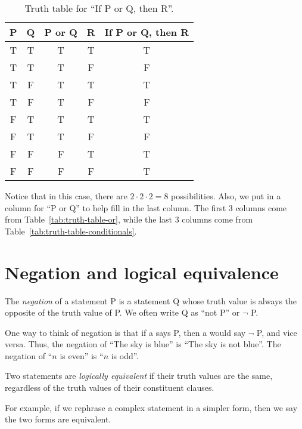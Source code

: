 \documentclass{tufte-book}
\begin{document}
\begin{table}
  \centering
  \begin{tabular}{ccccc}
    \toprule
    P & Q & P or Q & R & If P or Q, then R \\ \midrule
    T & T & T & T & T\\
    T & T & T & F & F\\
    T & F & T & T & T\\
    T & F & T & F & F\\ 
    F & T & T & T & T \\
    F & T & T & F & F \\
    F & F & F & T & T \\
    F & F & F & F & T \\
    \bottomrule
  \end{tabular}
  \caption{Truth table for ``If P or Q, then R''.}
  \label{tab:truth-table-if-p-or-q-then-r}
\end{table}
Notice that in this case, there are $2 \cdot 2 \cdot 2 = 8$ possibilities. Also, we put in a column for ``P or Q'' to help fill in the last column. The first 3 columns come from Table~\ref{tab:truth-table-or}, while the last 3 columns come from Table~\ref{tab:truth-table-conditionals}.



\section{Negation and logical equivalence}
\label{sec:negat-logic-equiv}

\begin{definition}
  The \emph{negation} of a statement P is a statement Q whose truth value is always the opposite of the truth value of P. We often write Q as ``not P'' or $\neg$ P.
\end{definition}
One way to think of negation is that if a \knave says P, then a \knight would say $\neg$ P, and vice versa. Thus, the negation of ``The sky is blue'' is ``The sky is not blue''. The negation of ``$n$ is even'' is ``$n$ is odd''.

\begin{definition}
  Two statements are \emph{logically equivalent}  if their truth values are the same, regardless of the truth values of their constituent clauses. 
\end{definition}
For example, if we rephrase a complex statement in a simpler form, then we say the two forms are equivalent. 
\end{document}
